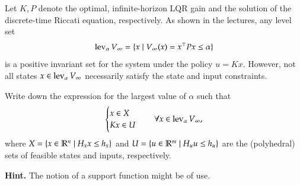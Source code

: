 \documentclass[]{article}
\begin{document}
\begin{assignment} \label{sess3:assign-lqr}
	Let $K, P$ denote the optimal, infinite-horizon LQR gain and the solution of 
	the discrete-time Riccati equation, respectively. As shown in the lectures, 
	any level set
	\[ 
		\operatorname{lev}_{\alpha} V_{\infty} = \{x \mid V_{\infty}(x) = x^\top P x \leq \alpha\}
	\]
	is a positive invariant set for the system under the policy $u = Kx$. However, 
	not all states $x \in \operatorname{lev}_{\alpha} V_{\infty}$ necessarily satisfy the state and input constraints. 

	Write down the expression for the largest value of $\alpha$ 
	such that
	\[ 
	\begin{cases}
		x \in X \\
		Kx \in U  
	\end{cases} \quad \forall x \in \operatorname{lev}_{\alpha} V_{\infty},
	\]
	where $X = \{x \in \mathbb{R}^n \mid H_x x \leq h_x\}$ and $U = \{u \in \mathbb{R}^m \mid H_u u \leq h_u \}$ are 
	the (polyhedral) sets of feasible states and inputs, respectively.

	\textbf{Hint.} The notion of a support function might be of use.
\end{assignment}
\end{document}
